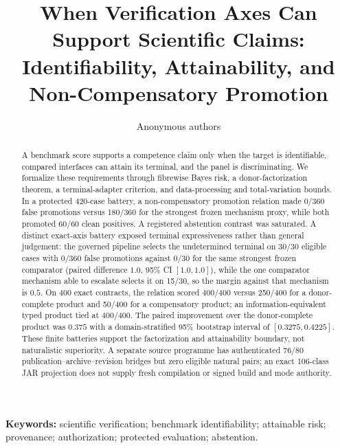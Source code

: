 \documentclass[10pt]{article}
\title{When Verification Axes Can Support Scientific Claims:\\
Identifiability, Attainability, and Non-Compensatory Promotion}
\author{Anonymous authors}
\begin{document}
\maketitle

\begin{abstract}
A benchmark score supports a competence claim only when the target is
identifiable, compared interfaces can attain its terminal, and the panel is
discriminating.  We formalize these requirements through fibrewise Bayes risk,
a donor-factorization theorem, a terminal-adapter criterion, and
data-processing and total-variation bounds.  In a protected 420-case battery,
a non-compensatory promotion relation made 0/360 false promotions versus
180/360 for the strongest frozen mechanism proxy, while both promoted 60/60
clean positives.  A registered abstention contrast was saturated.  A distinct
exact-axis battery exposed terminal expressiveness rather than general
judgement: the governed pipeline selects the undetermined terminal on 30/30
eligible cases with 0/360 false promotions against 0/30 for the same strongest
frozen comparator (paired difference $1.0$, 95\% CI $[1.0,1.0]$), while the one
comparator mechanism able to escalate selects it on 15/30, so the margin
against that mechanism is $0.5$.  On 400 exact contracts, the relation scored 400/400 versus 250/400
for a donor-complete product and 50/400 for a compensatory product; an
information-equivalent typed product tied at 400/400.  The paired improvement
over the donor-complete product was $0.375$ with a domain-stratified 95\%
bootstrap interval of $[0.3275,0.4225]$.  These finite batteries support the
factorization and attainability boundary, not naturalistic superiority.  A
separate source programme has authenticated 76/80 publication--archive--revision
bridges but zero eligible natural pairs; an exact 106-class JAR projection does
not supply fresh compilation or signed build and mode authority.
\end{abstract}

\noindent\textbf{Keywords:} scientific verification; benchmark identifiability; attainable risk; provenance; authorization; protected evaluation; abstention.














\end{document}
